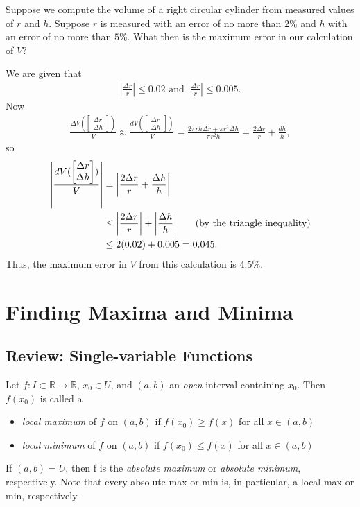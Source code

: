 \documentclass[12pt,letterpaper,reqno]{article}
\numberwithin{equation}{section}
\newcommand{\fixme}[1]{{\color{orange}{[#1]}}}
\begin{document}
{\begin{example}
	Suppose we compute the volume of a right circular cylinder from measured values of $r$ and $h$. Suppose $r$ is measured with an error of no more than $2\%$ and $h$ with an error of no more than $5\%$.  What then is the maximum error in our calculation of $V$?
	
	We are given that
	\begin{align*}
		|\frac{\Delta r}{r}|\leq 0.02 \text{ and } |\frac{\Delta r}{r}|\leq 0.005.
	\end{align*}
	Now
	\begin{align*}
		\frac{\Delta V(\begin{bmatrix} \Delta r \\ \Delta h \end{bmatrix})}{V} \approx \frac{dV(\begin{bmatrix} \Delta r \\ \Delta h \end{bmatrix})}{V}=\frac{2\pi r h \Delta r+\pi r^2 \Delta h}{\pi r^2 h}=\frac{2 \Delta r}{r}+\frac{dh}{h},
	\end{align*}
	so
	\begin{align*}
		\left|\frac{dV(\begin{bmatrix} \Delta r \\ \Delta h \end{bmatrix})}{V}\right|&=\left|\frac{2 \Delta r}{r}+\frac{\Delta h}{h}\right| \\
		&\leq \left|\frac{2 \Delta r}{r}\right|+\left|\frac{\Delta h}{h}\right| \hspace{0.5cm} \text{ (by the triangle inequality)}\\
		&\leq 2(0.02)+0.005=0.045.
	\end{align*}
	Thus, the maximum error in $V$ from this calculation is $4.5\%$.
\end{example}



\section{Finding Maxima and Minima}
\fixme{Infinitesimal to local to global. Example: if $df_p$ zero at every point of $U$ and $U$ connected then $f$ is constant on $U$}

\subsection{Review: Single-variable Functions}
Let $f:I \subset \mathbb{R} \to \mathbb{R}$, $x_0 \in U$, and $(a,b)$ an \emph{open} interval containing $x_0$. Then $f(x_0)$ is called a 
\begin{itemize}
	\item \emph{local maximum} of $f$ on $(a,b)$ if $f(x_0) \geq f(x)$ for all $x \in (a,b)$
	\item \emph{local minimum} of $f$ on $(a,b)$ if $f(x_0) \leq f(x)$ for all $x \in (a,b)$
\end{itemize}
If $(a,b)=U$, then f is the \emph{absolute maximum} or \emph{absolute minimum}, respectively. Note that every absolute max or min is, in particular, a local max or min, respectively.

}
\end{document}
